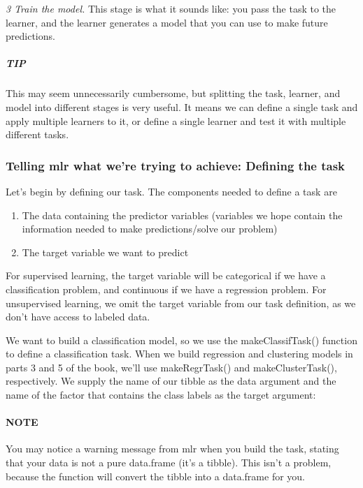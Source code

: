 \documentclass[
]{article}
\providecommand{\tightlist}{%
  \setlength{\itemsep}{0pt}\setlength{\parskip}{0pt}}
\begin{document}
\emph{3 Train the model.} This stage is what it sounds like: you pass
the task to the learner, and the learner generates a model that you can
use to make future predictions.

\subparagraph{TIP}\label{tip}

This may seem unnecessarily cumbersome, but splitting the task, learner,
and model into different stages is very useful. It means we can define a
single task and apply multiple learners to it, or define a single
learner and test it with multiple different tasks.

\subsubsection{Telling mlr what we're trying to achieve: Defining the
task}\label{telling-mlr-what-were-trying-to-achieve-defining-the-task}

Let's begin by defining our task. The components needed to define a task
are

\begin{enumerate}
\def\labelenumi{\arabic{enumi}.}
\tightlist
\item
  The data containing the predictor variables (variables we hope contain
  the information needed to make predictions/solve our problem)
\item
  The target variable we want to predict
\end{enumerate}

For supervised learning, the target variable will be categorical if we
have a classification problem, and continuous if we have a regression
problem. For unsupervised learning, we omit the target variable from our
task definition, as we don't have access to labeled data.

We want to build a classification model, so we use the makeClassifTask()
function to define a classification task. When we build regression and
clustering models in parts 3 and 5 of the book, we'll use makeRegrTask()
and makeClusterTask(), respectively. We supply the name of our tibble as
the data argument and the name of the factor that contains the class
labels as the target argument:

\paragraph{NOTE}\label{note-3}

You may notice a warning message from mlr when you build the task,
stating that your data is not a pure data.frame (it's a tibble). This
isn't a problem, because the function will convert the tibble into a
data.frame for you.
\end{document}
